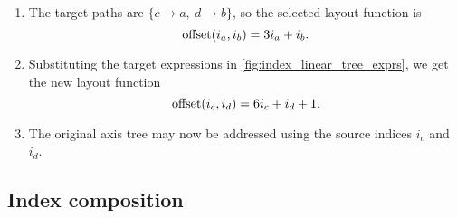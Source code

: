 \documentclass[thesis]{subfiles}
\begin{document}
\begin{enumerate}
  \item
    The target paths are $\{c \to a,\ d \to b\}$, so the selected layout function is
    \begin{equation*}
      \textnormal{offset}(i_a, i_b) = 3 i_a + i_b.
    \end{equation*}
  \item
    Substituting the target expressions in \cref{fig:index_linear_tree_exprs}, we get the new layout function
    \begin{equation*}
      \textnormal{offset}(i_c, i_d) = 6 i_c + i_d + 1.
    \end{equation*}
  \item
    The original axis tree may now be addressed using the source indices $i_c$ and $i_d$.
\end{enumerate}


\subsection{Index composition}
\label{sec:index_composition}
\end{document}
